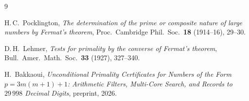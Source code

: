 \documentclass[11pt,a4paper]{article}
\theoremstyle{definition}
\theoremstyle{remark}
\begin{document}
\begin{thebibliography}{9}

H.\,C.~Pocklington,
\textit{The determination of the prime or composite nature of large numbers
by Fermat's theorem},
Proc.\ Cambridge Phil.\ Soc.\ \textbf{18} (1914--16), 29--30.

D.\,H.~Lehmer,
\textit{Tests for primality by the converse of Fermat's theorem},
Bull.\ Amer.\ Math.\ Soc.\ \textbf{33} (1927), 327--340.

H.~Bakkaoui,
\textit{Unconditional Primality Certificates for Numbers of the Form
$p = 3m(m+1)+1$: Arithmetic Filters, Multi-Core Search, and Records to
$29\,998$ Decimal Digits},
preprint, 2026.

\end{thebibliography}
\end{document}
